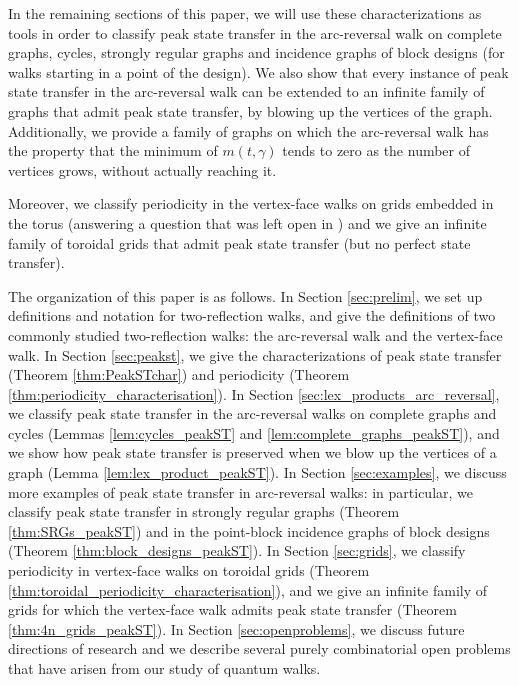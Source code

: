 \documentclass{article}
\numberwithin{equation}{section}
\begin{document}
In the remaining sections of this paper, we will use these characterizations as tools in order to classify peak state transfer in the arc-reversal walk on complete graphs, cycles, strongly regular graphs and incidence graphs of block designs (for walks starting in a point of the design). We also show that every instance of peak state transfer in the arc-reversal walk can be extended to an infinite family of graphs that admit peak state transfer, by blowing up the vertices of the graph. Additionally, we provide a family of graphs on which the arc-reversal walk has the property that the minimum of $m(t,\gamma)$ tends to zero as the number of vertices grows, without actually reaching it.

Moreover, we classify periodicity in the vertex-face walks on grids embedded in the torus (answering a question that was left open in \cite{GuoSch2024}) and we give an infinite family of toroidal grids that admit peak state transfer (but no perfect state transfer).

The organization of this paper is as follows. In Section \ref{sec:prelim}, we set up definitions and notation for two-reflection walks, and give the definitions of two commonly  studied two-reflection walks: the arc-reversal walk and the vertex-face walk. In Section \ref{sec:peakst}, we give the characterizations of peak state transfer (Theorem \ref{thm:PeakSTchar}) and periodicity (Theorem \ref{thm:periodicity_characterisation}). In Section \ref{sec:lex_products_arc_reversal}, we classify peak state transfer in the arc-reversal walks on complete graphs and cycles (Lemmas \ref{lem:cycles_peakST} and \ref{lem:complete_graphs_peakST}), and we show how peak state transfer is preserved when we blow up the vertices of a graph (Lemma \ref{lem:lex_product_peakST}). In Section \ref{sec:examples}, we discuss more examples of peak state transfer in arc-reversal walks: in particular, we classify peak state transfer in strongly regular graphs (Theorem \ref{thm:SRGs_peakST}) and in the point-block incidence graphs of block designs (Theorem \ref{thm:block_designs_peakST}). In Section \ref{sec:grids}, we classify periodicity in vertex-face walks on toroidal grids (Theorem \ref{thm:toroidal_periodicity_characterisation}), and we give an infinite family of grids for which the vertex-face walk admits peak state transfer (Theorem \ref{thm:4n_grids_peakST}). In Section \ref{sec:openproblems}, we discuss future directions of research and we describe several purely combinatorial open problems that have arisen from our study of quantum walks.
\end{document}
